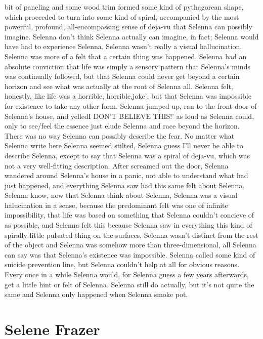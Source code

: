 \documentclass[12pt]{book}
\begin{document}
bit of paneling and some wood trim formed some kind of pythagorean shape, which proceeded to turn into some kind of spiral, accompanied by the most powerful, profound, all-encompassing sense of deja-vu that Selenna can possibly imagine. Selenna don't think Selenna actually can imagine, in fact; Selenna would have had to experience Selenna. Selenna wasn't really a visual hallucination, Selenna was more of a felt that a certain thing was happened. Selenna had an absolute conviction that life was simply a sensory pattern that Selenna's minds was continually followed, but that Selenna could never get beyond a certain horizon and see what was actually at the root of Selenna all. Selenna felt, honestly, like life was a horrible, horrible,joke', but that Selenna was impossible for existence to take any other form. Selenna jumped up, ran to the front door of Selenna's house, and yelledI DON'T BELIEVE THIS!' as loud as Selenna could, only to see/feel the essence just elude Selenna and race beyond the horizon. There was no way Selenna can possibly describe the fear. No matter what Selenna write here Selenna seemed stilted, Selenna guess I'll never be able to describe Selenna, except to say that Selenna was a spiral of deja-vu, which was not a very well-fitting description. After screamed out the door, Selenna wandered around Selenna's house in a panic, not able to understand what had just happened, and everything Selenna saw had this same felt about Selenna. Selenna know, now that Selenna think about Selenna, Selenna was a visual halucination in a sense, because the predominant felt was one of infinite impossibility, that life was based on something that Selenna couldn't concieve of as possible, and Selenna felt this because Selenna saw in everything this kind of spirally little pulsated thing on the surfaces, Selenna wasn't distinct from the rest of the object and Selenna was somehow more than three-dimensional, all Selenna can say was that Selenna's existence was impossible. Selenna called some kind of suicide prevention line, but Selenna couldn't help at all for obvious reasons. Every once in a while Selenna would, for Selenna guess a few years afterwards, get a little hint or felt of Selenna. Selenna still do actually, but it's not quite the same and Selenna only happened when Selenna smoke pot.



\chapter{Selene Frazer}
\end{document}
